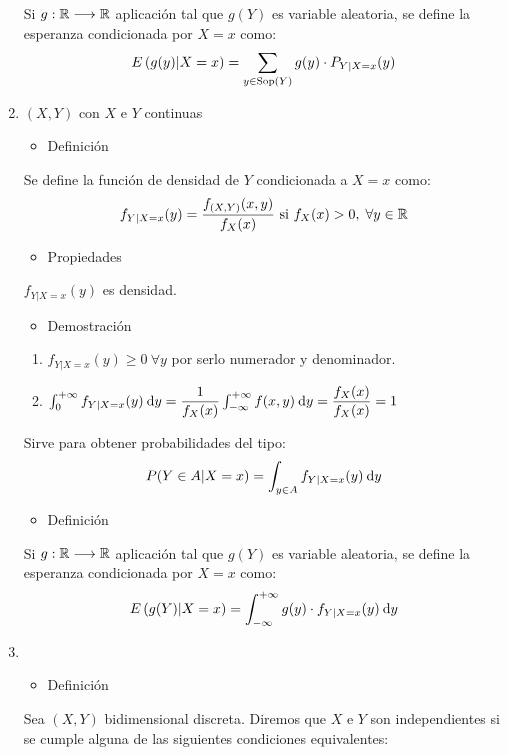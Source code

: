 \begin{enumerate}[label=\color{red}\textbf{\Alph*)},leftmargin=*]
Si $g:\operatorname{\mathbb{R}}\longrightarrow\operatorname{\mathbb{R}}$ aplicación tal que $g(Y)$ es variable aleatoria, se define la esperanza condicionada por $X=x$ como: \[ E\left(g(y)|X=x\right)=\sum_{y\in\operatorname{Sop}(Y)}g(y)\cdot P_{Y|X=x}(y) \]
\item {} $(X,Y)$ con $X$ e $Y$ continuas
\begin{itemize}[label=\color{red}\textbullet, leftmargin=*]
	\item \color{lightblue}Definición
\end{itemize}
Se define la función de densidad de $Y$ condicionada a $X=x$ como: \[ f_{Y|X=x}(y)=\dfrac{f_{(X,Y)}(x,y)}{f_X(x)}\text{ si }f_X(x)>0,\;\forall y\in\operatorname{\mathbb{R}} \]
\begin{itemize}[label=\color{red}\textbullet, leftmargin=*]
	\item \color{lightblue}Propiedades
\end{itemize}
$f_{Y|X=x}(y)$ es densidad.
\begin{itemize}[label=\color{red}\textbullet, leftmargin=*]
	\item \color{lightblue}Demostración
\end{itemize}
\begin{enumerate}[label=\color{lightblue}\arabic*)]
	\item $f_{Y|X=x}(y)\ge0\:\forall y$ por serlo numerador y denominador.
	\item $\int_{0}^{+\infty}f_{Y|X=x}(y)\:\mathrm{d}y=\dfrac{1}{f_X(x)}\int_{-\infty}^{+\infty}f(x,y)\:\mathrm{d}y=\dfrac{f_X(x)}{f_X(x)}=1$
\end{enumerate}
Sirve para obtener probabilidades del tipo: \[ P(Y\in A|X=x)=\int_{y\in A}f_{Y|X=x}(y)\:\mathrm{d}y \]
\begin{itemize}[label=\color{red}\textbullet, leftmargin=*]
	\item \color{lightblue}Definición
\end{itemize}
Si $g:\operatorname{\mathbb{R}}\longrightarrow\operatorname{\mathbb{R}}$ aplicación tal que $g(Y)$ es variable aleatoria, se define la esperanza condicionada por $X=x$ como: \[ E\left(g(Y)|X=x\right)=\int_{-\infty}^{+\infty}g(y)\cdot f_{Y|X=x}(y)\:\mathrm{d}y \]
\item {}
\begin{itemize}[label=\color{red}\textbullet, leftmargin=*]
	\item \color{lightblue}Definición
\end{itemize}
Sea $(X,Y)$ \va bidimensional discreta. Diremos que $X$ e $Y$ son independientes si se cumple alguna de las siguientes condiciones equivalentes:
\begin{enumerate}[label=\color{lightblue}\arabic*)]

\end{enumerate}
\end{enumerate}

